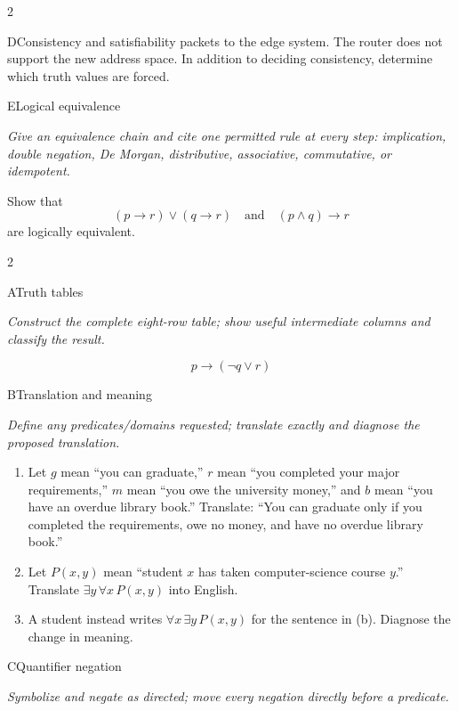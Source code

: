 \documentclass[9pt]{extarticle}
\begin{document}
\begin{multicols}{2}
\begin{CoreProblem}{D}{Consistency and satisfiability}
packets to the edge system. The router does not support the new address space.
In addition to deciding consistency, determine which truth values are forced.
\end{CoreProblem}
\begin{CoreProblem}{E}{Logical equivalence}
{\scriptsize\textit{Give an equivalence chain and cite one permitted rule at every step: implication, double negation, De Morgan, distributive, associative, commutative, or idempotent.}\par}
Show that
\[
  (p\to r)\lor(q\to r)
  \quad\text{and}\quad
  (p\land q)\to r
\]
are logically equivalent.
\end{CoreProblem}
\end{multicols}
\CoreWorkArea
\FormBreak
{}
\begin{multicols}{2}
\begin{CoreProblem}{A}{Truth tables}
{\scriptsize\textit{Construct the complete eight-row table; show useful intermediate columns and classify the result.}\par}
\[
  p\to(\neg q\lor r)
\]
\end{CoreProblem}
\begin{CoreProblem}{B}{Translation and meaning}
{\scriptsize\textit{Define any predicates/domains requested; translate exactly and diagnose the proposed translation.}\par}
\begin{enumerate}[label=(\alph*)]
  \item Let $g$ mean ``you can graduate,'' $r$ mean ``you completed your major
        requirements,'' $m$ mean ``you owe the university money,'' and $b$
        mean ``you have an overdue library book.'' Translate: ``You can
        graduate only if you completed the requirements, owe no money, and
        have no overdue library book.''
  \item Let $P(x,y)$ mean ``student $x$ has taken computer-science course
        $y$.'' Translate $\exists y\,\forall x\,P(x,y)$ into English.
  \item A student instead writes $\forall x\,\exists y\,P(x,y)$ for the
        sentence in (b). Diagnose the change in meaning.
\end{enumerate}
\end{CoreProblem}
\begin{CoreProblem}{C}{Quantifier negation}
{\scriptsize\textit{Symbolize and negate as directed; move every negation directly before a predicate.}\par}

\end{CoreProblem}
\end{multicols}
\end{document}
